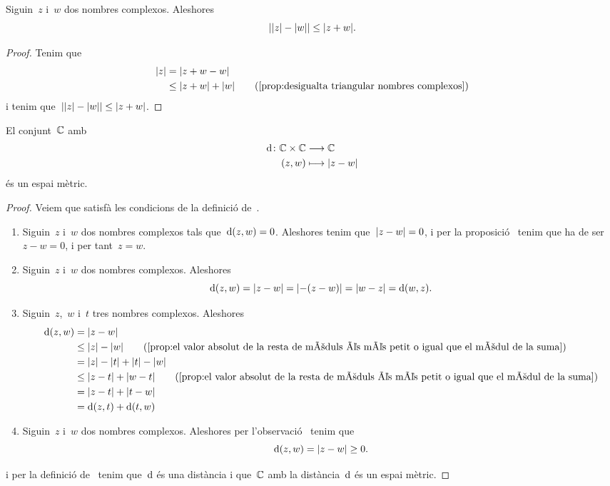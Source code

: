 \documentclass[../Apunts.tex]{subfiles}
\begin{document}
	\begin{proposition}
		\label{prop:el valor absolut de la resta de mòduls és més petit o igual que el mòdul de la suma}
		Siguin~\(z\) i~\(w\) dos nombres complexos. Aleshores
		\[\abs{\modul{z}-\modul{w}}\leq\modul{z+w}.\]
	\end{proposition}
	\begin{proof}
		Tenim que
		\begin{align*}
			\modul{z}&=\modul{z+w-w} \\
			&\leq\modul{z+w}+\modul{w} \tag{\ref{prop:desigualta triangular nombres complexos}}
		\end{align*}
		i tenim que~\(\abs{\modul{z}-\modul{w}}\leq\modul{z+w}\).
	\end{proof}
	\begin{proposition}
		\label{prop:els complexos són un espai mètric}
		El conjunt~\(\mathbb{C}\) amb
		\begin{align*}
			\distancia\colon\CC\times\CC&\longrightarrow\CC \\
			(z,w)&\longmapsto\modul{z-w}
		\end{align*}
		és un espai mètric.
	\end{proposition}
	\begin{proof}
		Veiem que satisfà les condicions de la definició de~.
		\begin{enumerate}
			\item Siguin~\(z\) i~\(w\) dos nombres complexos tals que~\(\operatorname{d}(z,w)=0\). Aleshores tenim que~\(\modul{z-w}=0\), i per la proposició~ tenim que ha de ser~\(z-w=0\), i per tant~\(z=w\).
			\item Siguin~\(z\) i~\(w\) dos nombres complexos. Aleshores
			\[\distancia(z,w)=\modul{z-w}=\modul{-(z-w)}=\modul{w-z}=\distancia(w,z).\]
			\item Siguin~\(z\),~\(w\) i~\(t\) tres nombres complexos. Aleshores
			\begin{align*}
				\distancia(z,w)&=\modul{z-w} \\
				&\leq\modul{z}-\modul{w} \tag{\ref{prop:el valor absolut de la resta de mòduls és més petit o igual que el mòdul de la suma}}\\
				&=\modul{z}-\modul{t}+\modul{t}-\modul{w} \\
				&\leq\modul{z-t}+\modul{w-t} \tag{\ref{prop:el valor absolut de la resta de mòduls és més petit o igual que el mòdul de la suma}}\\
				&=\modul{z-t}+\modul{t-w} \\
				&=\distancia(z,t)+\distancia(t,w)
			\end{align*}
			\item Siguin~\(z\) i~\(w\) dos nombres complexos. Aleshores per l'observació~ tenim que
			\[\distancia(z,w)=\modul{z-w}\geq0.\]
		\end{enumerate}
		i per la definició de~ tenim que~\(\operatorname{d}\) és una distància i que~\(\mathbb{C}\) amb la distància~\(\operatorname{d}\) és un espai mètric.
	\end{proof}
\end{document}
